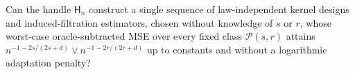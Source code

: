 Can the handle \(\mathsf H_n\) construct a single sequence of law-independent kernel designs and induced-filtration estimators, chosen without knowledge of \(s\) or \(r\), whose worst-case oracle-subtracted MSE over every fixed class \(\mathcal P(s,r)\) attains \(n^{-1-2s/(2s+d)}\vee n^{-1-2r/(2r+d)}\) up to constants and without a logarithmic adaptation penalty?